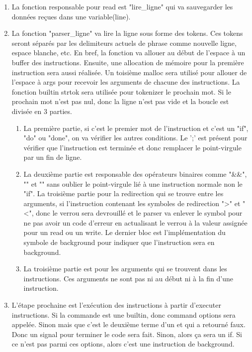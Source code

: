 \documentclass{article}
\begin{document}
\begin{enumerate}
\item{La fonction responsable pour read est "lire\_ligne" qui va sauvegarder les données reçues dans une variable(line).} 
\item{La fonction "parser\_ligne" va lire la ligne sous forme des tokens. Ces tokens seront séparés par les delimiteurs actuels de phrase comme nouvelle ligne, espace blanche, etc. En bref, la fonction va allouer au début de l'espace à un buffer des instructions. Ensuite, une allocation de mémoire pour la première instruction sera aussi réalisée. Un toisième malloc sera utilisé pour allouer de l'espace à args pour recevoir les arguments de chacune des instructions. La fonction builtin strtok sera utilisée pour tokenizer le prochain mot. Si le prochain mot n'est pas nul, donc la ligne n'est pas vide et la boucle est divisée en 3 parties.}
\begin{enumerate}
\item{La première partie, si c'est le premier mot de l'instruction et c'est un "if", "do" ou "done", on va vérifier les autres conditions. Le ';' est présent pour vérifier que l'instruction est terminée et donc remplacer le point-virgule par un fin de ligne.}

\item{La deuxième partie est responsable des opérateurs binaires comme "\&\&", "\textbar\textbar" et "\textbar" sans oublier le point-virgule lié à une instruction normale non le "if". La troisième partie pour la redirection qui se trouve entre les arguments, si l'instruction contenant les symboles de redirection "\textgreater" et "\textless", donc le verrou sera devrouillé et le parser va enlever le symbol pour ne pas avoir un code d'erreur en actualisant le verrou à la valeur assignée pour un read ou un write. Le dernier bloc est l'implémentation du symbole de background pour indiquer que l'instruction sera en background.}

\item{La troisième partie est pour les arguments qui se trouvent dans les instructions. Ces arguments ne sont pas ni au début ni à la fin d'une instruction.}
\end{enumerate}

\item{L'étape prochaine est l'exécution des instructions à partir d'executer instructions. Si la commande est une builtin, donc command options sera appelée. Sinon mais que c'est le deuxième terme d'un et qui a retourné faux. Donc un signal pour terminer le code sera fait. Sinon, alors ça sera un if. Si ce n'est pas parmi ces options, alors c'est une instruction de background.}


\end{enumerate}
\end{document}
